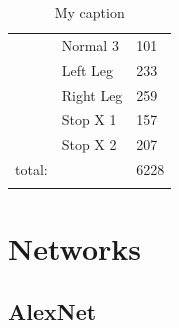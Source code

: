 \documentclass[11pt]{article} %
\begin{document}
\begin{appendices}
\begin{table}[]
\begin{longtable}{lll}
        & Normal 3                        & 101                        \\
        & Left Leg                        & 233                        \\
        & Right Leg                       & 259                        \\
        & Stop X 1                        & 157                        \\
        & Stop X 2                        & 207                        \\ \hline
total:  &                                 & 6228                       \\
        &                                 &                           
\end{longtable}
\caption{My caption}
\label{my-label}
\end{table}



\section{Networks}
\label{sec:networkCodes}

\subsection{AlexNet}

\end{appendices}
\end{document}
